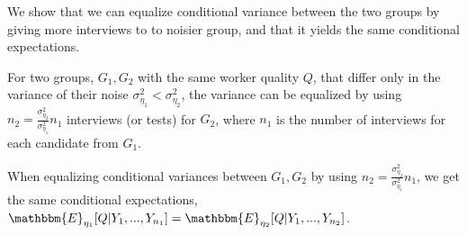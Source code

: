 We show that we can equalize conditional variance  between the two groups by giving more interviews to to noisier group, and that it yields the same conditional expectations.

\begin{theorem}\label{thm:EqVariances}
For two groups, $G_1,G_2$ with the same worker quality $Q$, that differ only in the variance of their noise 
$\sigma_{\eta_1}^2<\sigma_{\eta_2}^2$, the variance can be equalized by using $n_2=\frac{\sigma_{\eta_2}^2}{\sigma_{\eta_1}^2}n_1$ interviews (or tests) for $G_2$, where $n_1$ is the number of interviews for each candidate from $G_1$. 
\end{theorem}

\begin{theorem}\label{thm:EqExpectations}
When equalizing conditional variances between $G_1,G_2$ by using $n_2=\frac{\sigma_{\eta_2}^2}{\sigma_{\eta_1}^2}n_1$, we get the same conditional expectations,  $\mathbbm{E}_{\eta_1}[Q|Y_1,...,Y_{n_1}]=\mathbbm{E}_{\eta_2}[Q|Y_1,...,Y_{n_2}]$.
\end{theorem}